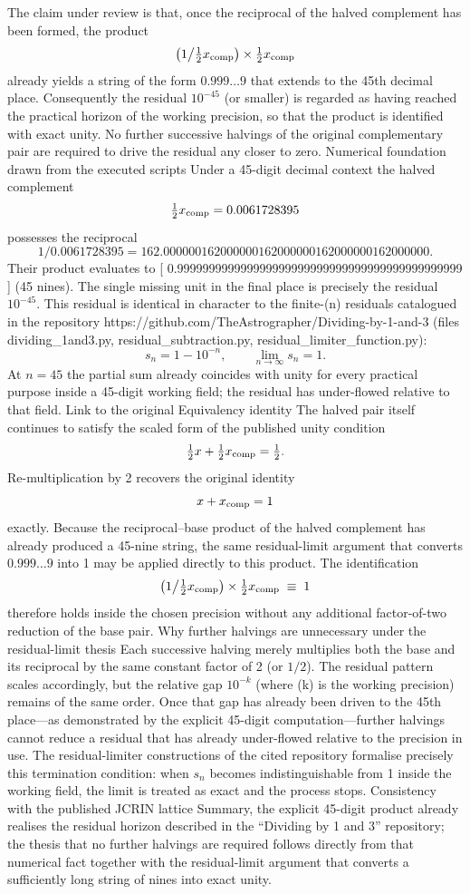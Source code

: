 The claim under review is that, once the reciprocal of the halved complement has been formed, the product
\[
\bigl(1\big/\tfrac12 x_{\rm comp}\bigr)\times\tfrac12 x_{\rm comp}
\]
already yields a string of the form \(0.999\ldots9\) that extends to the 45th decimal place. Consequently the residual \(10^{-45}\) (or smaller) is regarded as having reached the practical horizon of the working precision, so that the product is identified with exact unity. No further successive halvings of the original complementary pair are required to drive the residual any closer to zero.
Numerical foundation drawn from the executed scripts
Under a 45-digit decimal context the halved complement
\[
\tfrac12 x_{\rm comp}=0.0061728395
\]
possesses the reciprocal
\[
1\big/0.0061728395=162.000000162000000162000000162000000162000000.
\]
Their product evaluates to
[
0.999999999999999999999999999999999999999999999
]
(45 nines). The single missing unit in the final place is precisely the residual \(10^{-45}\).  
This residual is identical in character to the finite-(n) residuals catalogued in the repository https://github.com/TheAstrographer/Dividing-by-1-and-3 (files dividing_1and3.py, residual_subtraction.py, residual_limiter_function.py):
\[
s_n=1-10^{-n},\qquad\lim_{n\to\infty}s_n=1.
\]
At \(n=45\) the partial sum already coincides with unity for every practical purpose inside a 45-digit working field; the residual has under-flowed relative to that field.
Link to the original Equivalency identity
The halved pair itself continues to satisfy the scaled form of the published unity condition
\[
\tfrac12 x+\tfrac12 x_{\rm comp}=\tfrac12.
\]
Re-multiplication by 2 recovers the original identity
\[
x+x_{\rm comp}=1
\]
exactly. Because the reciprocal–base product of the halved complement has already produced a 45-nine string, the same residual-limit argument that converts \(0.999\ldots9\) into 1 may be applied directly to this product. The identification
\[
\bigl(1\big/\tfrac12 x_{\rm comp}\bigr)\times\tfrac12 x_{\rm comp}\;\equiv\;1
\]
therefore holds inside the chosen precision without any additional factor-of-two reduction of the base pair.
Why further halvings are unnecessary under the residual-limit thesis
Each successive halving merely multiplies both the base and its reciprocal by the same constant factor of 2 (or \(1/2\)). The residual pattern scales accordingly, but the relative gap \(10^{-k}\) (where (k) is the working precision) remains of the same order. Once that gap has already been driven to the 45th place—as demonstrated by the explicit 45-digit computation—further halvings cannot reduce a residual that has already under-flowed relative to the precision in use. The residual-limiter constructions of the cited repository formalise precisely this termination condition: when \(s_n\) becomes indistinguishable from 1 inside the working field, the limit is treated as exact and the process stops.
Consistency with the published JCRIN lattice
Summary, the explicit 45-digit product already realises the residual horizon described in the “Dividing by 1 and 3” repository; the thesis that no further halvings are required follows directly from that numerical fact together with the residual-limit argument that converts a sufficiently long string of nines into exact unity.

